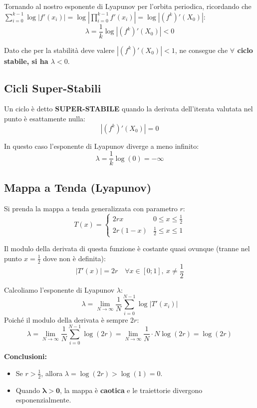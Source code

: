 \documentclass[openany]{book}
\theoremstyle{definition}
\theoremstyle{remark}
\begin{document}
Tornando al nostro esponente di Lyapunov per l'orbita periodica, ricordando che $\sum_{i=0}^{k-1} \log|f'(x_i)| = \log \left| \prod_{i=0}^{k-1} f'(x_i) \right| = \log|(f^k)'(X_0)|$:
$$ \lambda = \frac{1}{k} \log |(f^k)'(X_0)| < 0 $$

Dato che per la stabilità deve valere $|(f^k)'(X_0)| < 1$, ne consegue che \textbf{$\forall$ ciclo stabile, si ha $\lambda < 0$}.

\subsection{Cicli Super-Stabili}

Un ciclo è detto \textbf{SUPER-STABILE} quando la derivata dell'iterata valutata nel punto è esattamente nulla:
$$ |(f^k)'(X_0)| = 0 $$

In questo caso l'esponente di Lyapunov diverge a meno infinito:
$$ \lambda = \frac{1}{k} \log(0) = -\infty $$

\subsection{Mappa a Tenda (Lyapunov)}

Si prenda la mappa a tenda generalizzata con parametro $r$:
$$ T(x) = \begin{cases} 
2rx & 0 \leq x \leq \frac{1}{2} \\ 
2r(1-x) & \frac{1}{2} \leq x \leq 1 
\end{cases} $$

Il modulo della derivata di questa funzione è costante quasi ovunque (tranne nel punto $x = \frac{1}{2}$ dove non è definita):
$$ |T'(x)| = 2r \quad \forall x \in [0; 1], \ x \neq \frac{1}{2} $$

Calcoliamo l'esponente di Lyapunov $\lambda$:
$$ \lambda = \lim_{N \to \infty} \frac{1}{N} \sum_{i=0}^{N-1} \log |T'(x_i)| $$
Poiché il modulo della derivata è sempre $2r$:
$$ \lambda = \lim_{N \to \infty} \frac{1}{N} \sum_{i=0}^{N-1} \log(2r) = \lim_{N \to \infty} \frac{1}{N} \cdot N \log(2r) = \log(2r) $$

\textbf{Conclusioni:}
\begin{itemize}
    \item Se $r > \frac{1}{2}$, allora $\lambda = \log(2r) > \log(1) = 0$.
    \item Quando $\mathbf{\lambda > 0}$, la mappa è \textbf{caotica} e le traiettorie divergono esponenzialmente.
\end{itemize}
\end{document}
